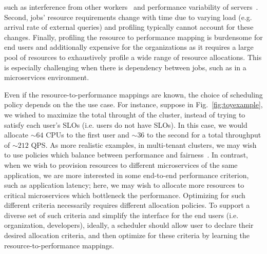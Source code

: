 such as interference from other workers~\cite{delimitrou2013paragon}
and performance variability of servers~\cite{tailatscale}.
Second, jobs' resource requirements change with time due to varying load (e.g. arrival rate
of external queries) and profiling typically cannot account for these
changes. 
Finally, profiling the resource to performance mapping is burdensome 
for end users and additionally expensive for the organizations as 
it requires a large pool of resources to
exhaustively profile a wide range of resource allocations.
This is especially challenging when there is dependency between jobs,
such as in a microservices environment\cite{deathstarbench}.



Even if the resource-to-performance mappings are known,
the choice of scheduling policy depends on the the use case.
For instance, suppose in Fig.~\ref{fig:toyexample}, we wished to maximize the total throught 
of the cluster, instead of trying to satisfy each user's SLOs (i.e. users do not have SLOs).
In this case, we would allocate $\sim$$64$ CPUs to the first user and $\sim$$36$ to the second
for a total throughput of $\sim$$212$ QPS.
As more realistic examples,
in multi-tenant clusters, we may wish to use policies which balance
between performance and fairness~\cite{kelly1998rate,demers1989analysis,ghodsi2011dominant}.
In contrast,
when we wish to provision resources to different microservices of the same application, we are
more interested in some end-to-end performance criterion,
such as application latency;
here, we may wish to allocate more resources to critical microservices which bottleneck the
performance.
Optimizing for such different criteria necessarily requires different allocation policies.
To support a diverse set of such criteria and
simplify the interface for the end users (i.e. organization, developers), ideally,
a scheduler should allow user to declare their desired allocation criteria, and then
optimize for these criteria by learning the resource-to-performance mappings.

